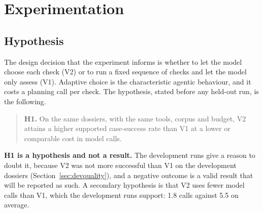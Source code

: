 \chapter{Experimentation}
\label{ch:exp}

\section{Hypothesis}
The design decision that the experiment informs is whether to let the model choose each check (V2) or to run a
fixed sequence of checks and let the model only assess (V1). Adaptive choice is the characteristic agentic
behaviour, and it costs a planning call per check. The hypothesis, stated before any held-out run, is the
following.

\begin{quote}
\textbf{H1.} On the same dossiers, with the same tools, corpus and budget, V2 attains a higher supported
case-success rate than V1 at a lower or comparable cost in model calls.
\end{quote}

\textbf{H1 is a hypothesis and not a result.} The development runs give a reason to doubt it, because V2 was not
more successful than V1 on the development dossiers (Section~\ref{sec:devquality}), and a negative outcome is
a valid result that will be reported as such. A secondary hypothesis is that V2 uses fewer model calls than
V1, which the development runs support: 1.8 calls against 5.5 on average.

